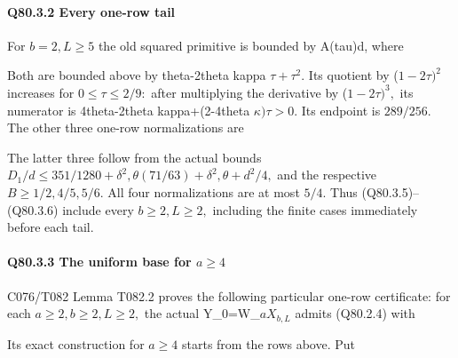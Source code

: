 \paragraph{Q80.3.2 Every one-row tail}

For \(b=2,\allowbreak  L\ge 5\) the old squared primitive is bounded by A(tau)d,
where


Both are bounded above by theta-2theta kappa \(\tau+\tau^2.\)
Its quotient by (\(1-2\tau)^2\) increases for \(0\le \tau\le 2/9:\)
after multiplying the derivative by (\(1-2\tau)^3,\allowbreak \) its numerator is
4theta-2theta kappa+(2-4theta \(\kappa)\tau>0.\)
Its endpoint is \(289/256.\) The other three one-row normalizations are


The latter three follow from the actual bounds
\(D_1/d\le 351/1280+\delta^2,\allowbreak  \theta(71/63)+\delta^2,\allowbreak  \theta+d^2/4,\allowbreak \)
and the respective \(B\ge 1/2,\allowbreak  4/5,\allowbreak  5/6.\) All four normalizations are
at most \(5/4.\) Thus (Q80.3.5)--(Q80.3.6) include every \(b\ge 2,\allowbreak  L\ge 2,\allowbreak \)
including the finite cases immediately before each tail.

\paragraph{Q80.3.3 The uniform base for \(a\ge 4\)}

C076/T082 Lemma T082.2 proves the following particular one-row
certificate:
for each \(a\ge 2,\allowbreak  b\ge 2,\allowbreak  L\ge 2,\allowbreak \) the actual Y\_0=W\_\(aX_{b,\allowbreak  L}\) admits (Q80.2.4)
with


Its exact construction for \(a\ge 4\) starts from the rows above. Put

